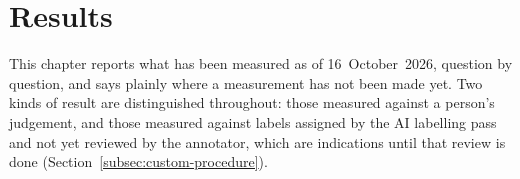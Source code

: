 
\chapter{Results}
\label{ch:results}

This chapter reports what has been measured as of 16~October~2026,
question by question, and says plainly where a measurement has not been
made yet. Two kinds of result are distinguished throughout: those
measured against a person's judgement, and those measured against
labels assigned by the AI labelling pass and not yet reviewed by the
annotator, which are indications until that review is done
(Section~\ref{subsec:custom-procedure}).



















